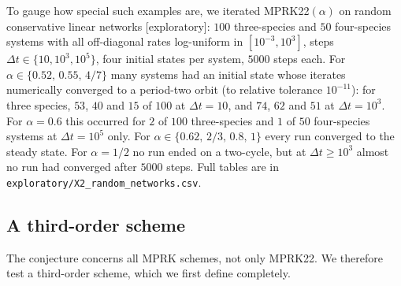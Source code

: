 \documentclass[11pt,a4paper]{article}
\theoremstyle{plain}
\theoremstyle{definition}
\newcommand{\status}[1]{\textsf{[#1]}}
\begin{document}
To gauge how special such examples are, we iterated MPRK22$(\alpha)$ on random conservative linear networks \status{exploratory}: $100$ three-species and $50$ four-species systems with all off-diagonal rates log-uniform in $[10^{-3},10^{3}]$, steps $\Delta t\in\{10,10^3,10^5\}$, four initial states per system, $5000$ steps each. For $\alpha\in\{0.52,\,0.55,\,4/7\}$ many systems had an initial state whose iterates numerically converged to a period-two orbit (to relative tolerance $10^{-11}$): for three species, $53$, $40$ and $15$ of $100$ at $\Delta t=10$, and $74$, $62$ and $51$ at $\Delta t=10^3$. For $\alpha=0.6$ this occurred for $2$ of $100$ three-species and $1$ of $50$ four-species systems at $\Delta t=10^5$ only. For $\alpha\in\{0.62,\,2/3,\,0.8,\,1\}$ every run converged to the steady state. For $\alpha=1/2$ no run ended on a two-cycle, but at $\Delta t\ge10^3$ almost no run had converged after $5000$ steps. Full tables are in \texttt{exploratory/X2\_random\_networks.csv}.

\subsection{A third-order scheme}

The conjecture concerns all MPRK schemes, not only MPRK22. We therefore test a third-order scheme, which we first define completely.
\end{document}
